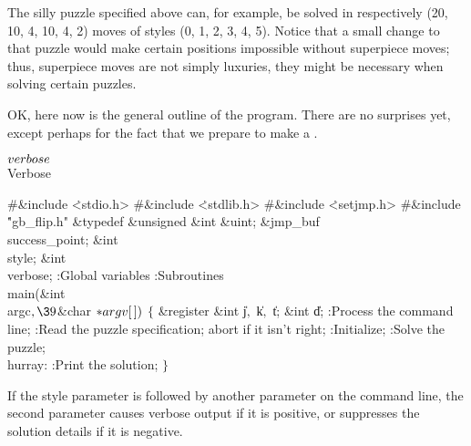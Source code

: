 The silly puzzle specified above can, for example, be solved in
respectively (20, 10, 4, 10, 4, 2) moves of styles (0, 1, 2, 3, 4, 5).
Notice that a small change to that puzzle would make certain positions
impossible without superpiece moves; thus, superpiece moves are not
simply luxuries, they might be necessary when solving certain puzzles.

\fi

OK, here now is the general outline of the program.
There are no surprises yet, except perhaps for the fact that we
prepare to make a .

\Y\B\4\D$\\{verbose}$ \5
\\{Verbose}\par
\Y\B\8\#\&{include} \.{<stdio.h>}\6
\8\#\&{include} \.{<stdlib.h>}\6
\8\#\&{include} \.{<setjmp.h>}\6
\8\#\&{include} \.{"gb\_flip.h"}\6
\&{typedef} \&{unsigned} \&{int} \&{uint};\6
\&{jmp\_buf} \\{success\_point};\6
\&{int} \\{style};\6
\&{int} \\{verbose};\7
:Global variables\X\6
:Subroutines\X\7
\\{main}(\&{int} \\{argc}${},\39{}$\&{char} ${}{*}\\{argv}[\,]){}$\1\1\2\2\6
${}\{{}$\1\6
\&{register} \&{int} \|j${},{}$ \|k${},{}$ \|t;\6
\&{int} \|d;\7
:Process the command line\X;\6
:Read the puzzle specification; abort if it isn't right\X;\6
:Initialize\X;\6
:Solve the puzzle\X;\6
\4\\{hurray}:\5
:Print the solution\X;\6
\4${}\}{}$\2\par
\fi

If the style parameter is followed by another parameter on the command
line, the second parameter causes verbose output if it is positive,
or suppresses the solution details if it is negative.

